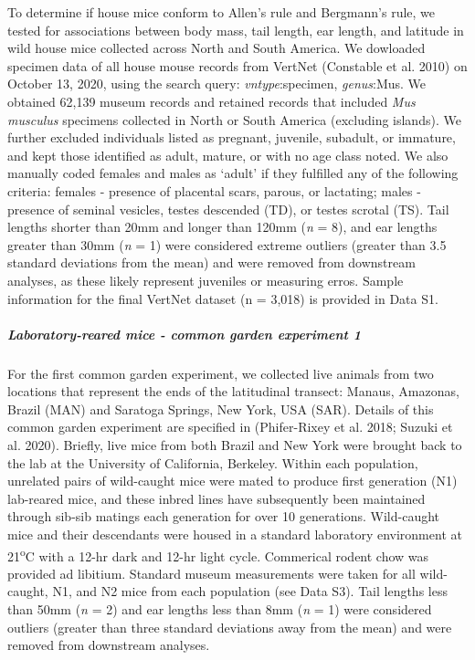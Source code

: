 \documentclass[]{article}
\let\oldsubparagraph\subparagraph
\renewcommand{\subparagraph}[1]{\oldsubparagraph{#1}\mbox{}}
\begin{document}
To determine if house mice conform to Allen's rule and Bergmann's rule,
we tested for associations between body mass, tail length, ear length,
and latitude in wild house mice collected across North and South
America. We dowloaded specimen data of all house mouse records from
VertNet (Constable et al. 2010) on October 13, 2020, using the search
query: \emph{vntype}:specimen, \emph{genus}:Mus. We obtained 62,139
museum records and retained records that included \emph{Mus musculus}
specimens collected in North or South America (excluding islands). We
further excluded individuals listed as pregnant, juvenile, subadult, or
immature, and kept those identified as adult, mature, or with no age
class noted. We also manually coded females and males as `adult' if they
fulfilled any of the following criteria: females - presence of placental
scars, parous, or lactating; males - presence of seminal vesicles,
testes descended (TD), or testes scrotal (TS). Tail lengths shorter than
20mm and longer than 120mm (\emph{n} = 8), and ear lengths greater than
30mm (\emph{n} = 1) were considered extreme outliers (greater than 3.5
standard deviations from the mean) and were removed from downstream
analyses, as these likely represent juveniles or measuring erros. Sample
information for the final VertNet dataset (n = 3,018) is provided in
Data S1.

\vspace{2.5mm}

\hypertarget{laboratory-reared-mice---common-garden-experiment-1}{%
\subparagraph{\texorpdfstring{\emph{Laboratory-reared mice - common
garden experiment
1}}{Laboratory-reared mice - common garden experiment 1}}\label{laboratory-reared-mice---common-garden-experiment-1}}

For the first common garden experiment, we collected live animals from
two locations that represent the ends of the latitudinal transect:
Manaus, Amazonas, Brazil (MAN) and Saratoga Springs, New York, USA
(SAR). Details of this common garden experiment are specified in
(Phifer-Rixey et al. 2018; Suzuki et al. 2020). Briefly, live mice from
both Brazil and New York were brought back to the lab at the University
of California, Berkeley. Within each population, unrelated pairs of
wild-caught mice were mated to produce first generation (N1) lab-reared
mice, and these inbred lines have subsequently been maintained through
sib-sib matings each generation for over 10 generations. Wild-caught
mice and their descendants were housed in a standard laboratory
environment at 21\textsuperscript{o}C with a 12-hr dark and 12-hr light
cycle. Commerical rodent chow was provided ad libitium. Standard museum
measurements were taken for all wild-caught, N1, and N2 mice from each
population (see Data S3). Tail lengths less than 50mm (\emph{n} = 2) and
ear lengths less than 8mm (\emph{n} = 1) were considered outliers
(greater than three standard deviations away from the mean) and were
removed from downstream analyses.
\end{document}
